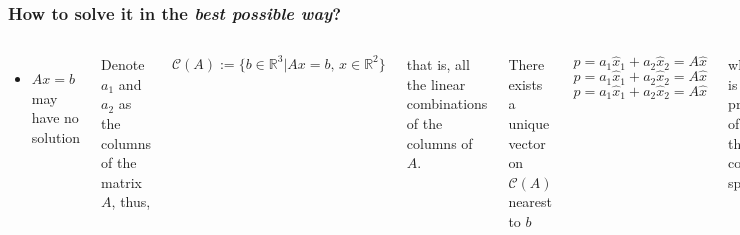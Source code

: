 \documentclass[aspectratio=169]{beamer}
\newcommand{\incfig}[2][1]{%
    \def\svgwidth{#1\columnwidth}
    {#2.pdf_tex} }
\begin{document}
\begin{frame} %
	\frametitle{How to solve it in the \textit{best possible way}?}
	
	\begin{columns}

	\begin{itemize}
		\item $Ax = b$ may have no solution
	\end{itemize}	

	Denote $a_1$ and $a_2$ as the columns of the matrix $A$, thus,

	\[ \mathcal{C}(A) := \{ b \in \mathbb{R}^3 | Ax = b, \, x \in \mathbb{R}^2 \} \]

	that is, all the linear combinations of the columns of $A$.

	There exists a unique vector on $\mathcal{C}(A)$ nearest to $b$

	\[ p = a_1 \hat{x}_1 + a_2 \hat{x}_2 = A\hat{x} \] 
	\[ p = a_1 \hat{x}_1 + a_2 \hat{x}_2 = A\hat{x} \] 
	\[ p = a_1 \hat{x}_1 + a_2 \hat{x}_2 = A\hat{x} \] 

	\noindent where $p$ is the projection of $b$ onto the column space!
\begin{itemize}
	\item A possible alternative $A \hat{x} = p$ 
\end{itemize}

\begin{figure}[ht]
    \centering
    \incfig{mainissue}
    \label{fig:mainissue}
\end{figure}

\end{columns}
\end{frame}
\end{document}
